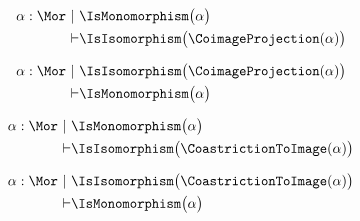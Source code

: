 \begin{sequent}
\begin{align*}
  \alpha:\Mor~|~ & \IsMonomorphism\big( \alpha \big) \\
  \vdash &\IsIsomorphism\big( \CoimageProjection( \alpha ) \big)
\end{align*}
\end{sequent}

\begin{sequent}
\begin{align*}
  \alpha:\Mor~|~ & \IsIsomorphism\big( \CoimageProjection( \alpha ) \big) \\
  \vdash &\IsMonomorphism\big( \alpha \big)
\end{align*}
\end{sequent}

\begin{sequent}
\begin{align*}
  \alpha:\Mor~|~ & \IsMonomorphism\big( \alpha \big) \\
  \vdash &\IsIsomorphism\big( \CoastrictionToImage( \alpha ) \big)
\end{align*}
\end{sequent}

\begin{sequent}
\begin{align*}
  \alpha:\Mor~|~ & \IsIsomorphism\big( \CoastrictionToImage( \alpha ) \big) \\
  \vdash &\IsMonomorphism\big( \alpha \big)
\end{align*}
\end{sequent}
